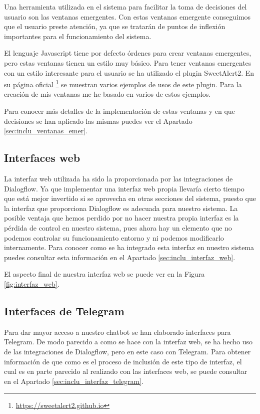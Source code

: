 Una herramienta utilizada en el sistema para facilitar la toma de decisiones del usuario son las ventanas emergentes. Con estas ventanas emergente conseguimos que el usuario preste atención, ya que se tratarán de puntos de inflexión importantes para el funcionamiento del sistema. 

El lenguaje Javascript tiene por defecto órdenes para crear ventanas emergentes, pero estas ventanas tienen un estilo muy básico. Para tener ventanas emergentes con un estilo interesante para el usuario se ha utilizado el \gls{plugin} SweetAlert2. En su página oficial \footnote{\url{https://sweetalert2.github.io}} se muestran varios ejemplos de usos de este \gls{plugin}. Para la creación de mis ventanas me he basado en varios de estos ejemplos.

Para conocer más detalles de la implementación de estas ventanas y en que decisiones se han aplicado las mismas puedes ver el Apartado \ref{sec:inclu_ventanas_emer}. 

\subsection{Interfaces web}

La interfaz web utilizada ha sido la proporcionada por las integraciones de Dialogflow. Ya que implementar una interfaz web propia llevaría cierto tiempo que está mejor invertido si se aprovecha en otras secciones del sistema, puesto que la interfaz que proporciona Dialogflow es adecuada para nuestro sistema. La posible ventaja que hemos perdido por no hacer nuestra propia interfaz es la pérdida de control en nuestro sistema, pues ahora hay un elemento que no podemos controlar su funcionamiento entorno y ni podemos modificarlo internamente. Para conocer como se ha integrado esta interfaz en nuestro sistema puedes consultar esta información en el Apartado \ref{sec:inclu_interfaz_web}.

El aspecto final de nuestra interfaz web se puede ver en la Figura \ref{fig:interfaz_web}.


\subsection{Interfaces de Telegram}

Para dar mayor acceso a nuestro chatbot se han elaborado interfaces para Telegram. De modo parecido a como se hace con la interfaz web, se ha hecho uso de las integraciones de Dialogflow, pero en este caso con Telegram. Para obtener información de que como es el proceso de inclusión de este tipo de interfaz, el cual es en parte parecido al realizado con las interfaces web, se puede consultar en el Apartado \ref{sec:inclu_interfaz_telegram}.

